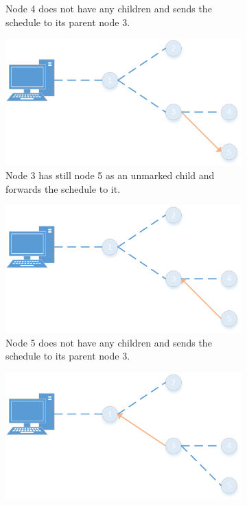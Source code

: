 \begin{figure}[htbp]
\begin{subfigure}[t]{0.4\textwidth}
        \caption{Node 4 does not have any children and sends the schedule to its parent node 3.}
        \label{fig:spreading6}
    \end{subfigure}
    \quad
    \quad
    \begin{subfigure}[t]{0.4\textwidth}
		\centering         
        \includegraphics[scale=0.6]{content/images/ScheduleSpreading/Part7}
        \caption{Node 3 has still node 5 as an unmarked child and forwards the schedule to it.}
        \label{fig:spreading7}
    \end{subfigure}
    \quad
    \quad
    \begin{subfigure}[t]{0.4\textwidth}
		\centering         
        \includegraphics[scale=0.6]{content/images/ScheduleSpreading/Part8}
        \caption{Node 5 does not have any children and sends the schedule to its parent node 3.}
        \label{fig:spreading8}
    \end{subfigure}
    \quad
    \quad
    \begin{subfigure}[t]{0.4\textwidth}
		\centering
    		\includegraphics[scale=0.6]{content/images/ScheduleSpreading/Part9}

\end{subfigure}
\end{figure}
